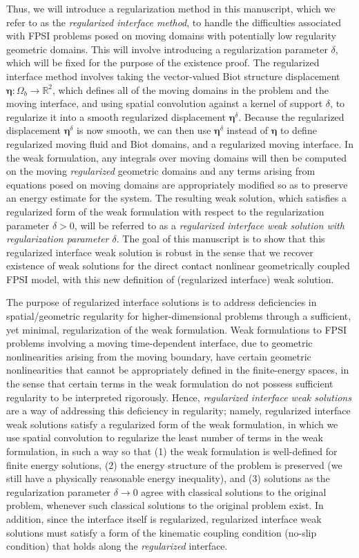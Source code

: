 \documentclass[11pt]{article}
\newcommand{\bd}{\boldsymbol}
\def\R{{\mathbb R}}
\theoremstyle{definition}
\begin{document}
Thus, we will introduce a regularization method in this manuscript, which we refer to as the \textit{regularized interface method}, to handle the difficulties associated with FPSI problems posed on moving domains with potentially low regularity geometric domains. This will involve introducing a regularization parameter $\delta$, which will be fixed for the purpose of the existence proof. The regularized interface method involves taking the vector-valued Biot structure displacement $\bd{\eta}: \Omega_{b} \to \R^{2}$, which defines all of the moving domains in the problem and the moving interface, and using spatial convolution against a kernel of support $\delta$, to regularize it into a smooth regularized displacement $\bd{\eta}^{\delta}$. Because the regularized displacement $\bd{\eta}^{\delta}$ is now smooth, we can then use $\bd{\eta}^{\delta}$ instead of $\bd{\eta}$ to define regularized moving fluid and Biot domains, and a regularized moving interface. In the weak formulation, any integrals over moving domains will then be computed on the moving \textit{regularized} geometric domains and any terms arising from equations posed on moving domains are appropriately modified so as to preserve an energy estimate for the system. The resulting weak solution, which satisfies a regularized form of the weak formulation with respect to the regularization parameter $\delta > 0$, will be referred to as a \textit{regularized interface weak solution with regularization parameter $\delta$}. The goal of this manuscript is to show that this regularized interface weak solution is robust in the sense that we recover existence of weak solutions for the direct contact nonlinear geometrically coupled FPSI model, with this new definition of (regularized interface) weak solution.

The purpose of regularized interface solutions is to address deficiencies in spatial/geometric regularity for higher-dimensional problems through a sufficient, yet minimal, regularization of the weak formulation. Weak formulations to FPSI problems involving a moving time-dependent interface, due to geometric nonlinearities arising from the moving boundary, have certain geometric nonlinearities that cannot be appropriately defined in the finite-energy spaces, in the sense that certain terms in the weak formulation do not possess sufficient regularity to be interpreted rigorously. Hence, \textit{regularized interface weak solutions} are a way of addressing this deficiency in regularity; namely, regularized interface weak solutions satisfy a regularized form of the weak formulation, in which we use spatial convolution to regularize the least number of terms in the weak formulation, in such a way so that (1) the weak formulation is well-defined for finite energy solutions, (2) the energy structure of the problem is preserved (we still have a physically reasonable energy inequality), and (3) solutions as the regularization parameter $\delta \to 0$ agree with classical solutions to the original problem, whenever such classical solutions to the original problem exist. In addition, since the interface itself is regularized, regularized interface weak solutions must satisfy a form of the kinematic coupling condition (no-slip condition) that holds along the \textit{regularized} interface. 
\end{document}
